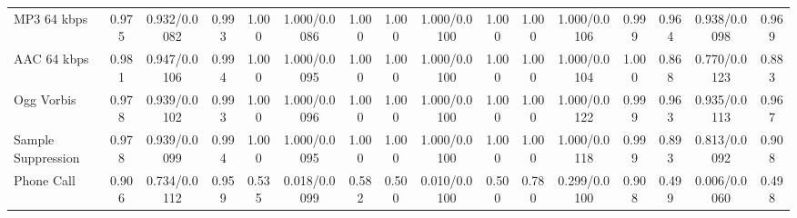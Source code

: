 \begin{table}[t]
{\begin{tabular}{l ccc ccc ccc ccc ccc}
MP3 64 kbps
& 0.975 & 0.932/0.0082 & 0.993
& 1.000 & 1.000/0.0086 & 1.000
& 1.000 & 1.000/0.0100 & 1.000
& 1.000 & 1.000/0.0106 & 0.999
& 0.964 & 0.938/0.0098 & 0.969 \\

AAC 64 kbps
& 0.981 & 0.947/0.0106 & 0.994
& 1.000 & 1.000/0.0095 & 1.000
& 1.000 & 1.000/0.0100 & 1.000
& 1.000 & 1.000/0.0104 & 1.000
& 0.868 & 0.770/0.0123 & 0.883 \\

Ogg Vorbis
& 0.978 & 0.939/0.0102 & 0.993
& 1.000 & 1.000/0.0096 & 1.000
& 1.000 & 1.000/0.0100 & 1.000
& 1.000 & 1.000/0.0122 & 0.999
& 0.963 & 0.935/0.0113 & 0.967 \\

Sample Suppression
& 0.978 & 0.939/0.0099 & 0.994
& 1.000 & 1.000/0.0095 & 1.000
& 1.000 & 1.000/0.0100 & 1.000
& 1.000 & 1.000/0.0118 & 0.999
& 0.893 & 0.813/0.0092 & 0.908 \\

Phone Call
& 0.906 & 0.734/0.0112 & 0.959
& 0.535 & 0.018/0.0099 & 0.582
& 0.500 & 0.010/0.0100 & 0.500
& 0.780 & 0.299/0.0100 & 0.908
& 0.499 & 0.006/0.0060 & 0.498 \\
\bottomrule
\end{tabular}
}
\end{table}
